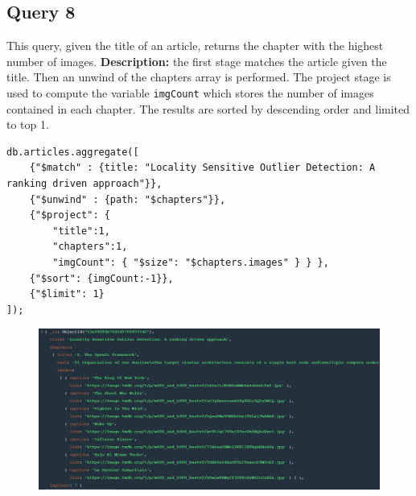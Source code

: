 \documentclass{Configuration_Files/PoliMi3i_thesis}
\begin{document}
\subsection{Query 8}
This query, given the title of an article, returns the chapter with the highest number of images.\newline
\textbf{Description:} the first stage matches the article given the title. Then an unwind of the chapters array is
performed. The project stage is used to compute the variable \verb|imgCount| which stores the number of images
contained in each chapter. The results are sorted by descending order and limited to top 1.
\begin{lstlisting}
db.articles.aggregate([
	{"$match" : {title: "Locality Sensitive Outlier Detection: A ranking driven approach"}},
	{"$unwind" : {path: "$chapters"}},
	{"$project": {
		"title":1,
		"chapters":1,
		"imgCount": { "$size": "$chapters.images" } } },
	{"$sort": {imgCount:-1}},
	{"$limit": 1}
]);
\end{lstlisting}
\begin{figure}[H]
\centering
\includegraphics[width=1\textwidth]{query/mongo_q8.PNG}
\label{fig:query8}
\end{figure}
\end{document}
